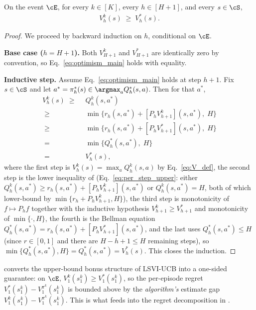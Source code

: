 \begin{lemma}[Optimism]\label{lem:optimism}
On the event $\cE$, for every $k \in [K]$, every $h \in [H+1]$, and every $s \in \cS$,
\begin{align}\label{eq:optimism_main}
V_h^k(s) \;\ge\; V_h^*(s).
\end{align}
\end{lemma}

\begin{proof}
We proceed by backward induction on $h$, conditional on $\cE$.

\textbf{Base case ($h = H+1$).} Both $V_{H+1}^k$ and $V_{H+1}^*$ are identically zero by convention, so Eq.~\eqref{eq:optimism_main} holds with equality.

\textbf{Inductive step.} Assume Eq.~\eqref{eq:optimism_main} holds at step $h + 1$. Fix $s \in \cS$ and let $a^* = \pi_h^*(s) \in \argmax_a Q_h^*(s, a)$. Then for that $a^*$,
\begin{align*}
V_h^k(s)
\;\ge\; & ~ Q_h^k(s, a^*) \\
\;\ge\; & ~ \min\bigl\{r_h(s, a^*) + [P_h V_{h+1}^k](s, a^*),\; H\bigr\} \\
\;\ge\; & ~ \min\bigl\{r_h(s, a^*) + [P_h V_{h+1}^*](s, a^*),\; H\bigr\} \\
\;=\; & ~ \min\bigl\{Q_h^*(s, a^*),\; H\bigr\} \\
\;=\; & ~ V_h^*(s),
\end{align*}
where the first step is $V_h^k(s) = \max_a Q_h^k(s, a)$ by Eq.~\eqref{eq:V_def}, the second step is the lower inequality of  (Eq.~\eqref{eq:per_step_upper}: either $Q_h^k(s, a^*) \ge r_h(s, a^*) + [P_h V_{h+1}^k](s, a^*)$ or $Q_h^k(s, a^*) = H$, both of which lower-bound by $\min\{r_h + P_h V_{h+1}^k, H\}$), the third step is monotonicity of $f \mapsto P_h f$ together with the inductive hypothesis $V_{h+1}^k \ge V_{h+1}^*$ and monotonicity of $\min\{\cdot, H\}$, the fourth is the Bellman equation $Q_h^*(s, a^*) = r_h(s, a^*) + [P_h V_{h+1}^*](s, a^*)$, and the last uses $Q_h^*(s, a^*) \le H$ (since $r \in [0, 1]$ and there are $H - h + 1 \le H$ remaining steps), so $\min\{Q_h^*(s, a^*), H\} = Q_h^*(s, a^*) = V_h^*(s)$. This closes the induction.
\end{proof}

\begin{remark}\label{rem:optimism_role}
 converts the upper-bound bonus structure of LSVI-UCB into a one-sided guarantee: on $\cE$, $V_1^k(s_1^k) \ge V_1^*(s_1^k)$, so the per-episode regret $V_1^*(s_1^k) - V_1^{\pi^k}(s_1^k)$ is bounded above by the \emph{algorithm's} estimate gap $V_1^k(s_1^k) - V_1^{\pi^k}(s_1^k)$. This is what feeds into the regret decomposition in .
\end{remark}
